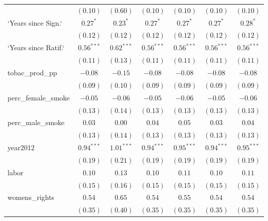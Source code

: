 \begin{table}[!h]
\begin{center}
\begin{tabular}{l c c c c c c }
                        & $(0.10)$      & $(0.60)$     & $(0.10)$      & $(0.10)$      & $(0.10)$      & $(0.10)$      \\
`Years since Sign.`     & $0.27^{*}$    & $0.23^{*}$   & $0.27^{*}$    & $0.27^{*}$    & $0.27^{*}$    & $0.28^{*}$    \\
                        & $(0.12)$      & $(0.12)$     & $(0.12)$      & $(0.12)$      & $(0.12)$      & $(0.12)$      \\
`Years since Ratif.`    & $0.56^{***}$  & $0.62^{***}$ & $0.56^{***}$  & $0.56^{***}$  & $0.56^{***}$  & $0.56^{***}$  \\
                        & $(0.11)$      & $(0.13)$     & $(0.11)$      & $(0.11)$      & $(0.11)$      & $(0.11)$      \\
tobac\_prod\_pp         & $-0.08$       & $-0.15$      & $-0.08$       & $-0.08$       & $-0.08$       & $-0.08$       \\
                        & $(0.09)$      & $(0.10)$     & $(0.09)$      & $(0.09)$      & $(0.09)$      & $(0.09)$      \\
perc\_female\_smoke     & $-0.05$       & $-0.06$      & $-0.05$       & $-0.06$       & $-0.05$       & $-0.06$       \\
                        & $(0.13)$      & $(0.14)$     & $(0.13)$      & $(0.13)$      & $(0.13)$      & $(0.13)$      \\
perc\_male\_smoke       & $0.03$        & $0.00$       & $0.04$        & $0.05$        & $0.03$        & $0.04$        \\
                        & $(0.13)$      & $(0.14)$     & $(0.13)$      & $(0.13)$      & $(0.13)$      & $(0.13)$      \\
year2012                & $0.94^{***}$  & $1.01^{***}$ & $0.94^{***}$  & $0.95^{***}$  & $0.94^{***}$  & $0.95^{***}$  \\
                        & $(0.19)$      & $(0.21)$     & $(0.19)$      & $(0.19)$      & $(0.19)$      & $(0.19)$      \\
labor                   & $0.10$        & $0.13$       & $0.10$        & $0.11$        & $0.10$        & $0.11$        \\
                        & $(0.15)$      & $(0.16)$     & $(0.15)$      & $(0.15)$      & $(0.15)$      & $(0.15)$      \\
womens\_rights          & $0.54$        & $0.65$       & $0.54$        & $0.55$        & $0.54$        & $0.54$        \\
                        & $(0.35)$      & $(0.40)$     & $(0.35)$      & $(0.35)$      & $(0.35)$      & $(0.35)$      \\

\end{tabular}
\end{center}
\end{table}
